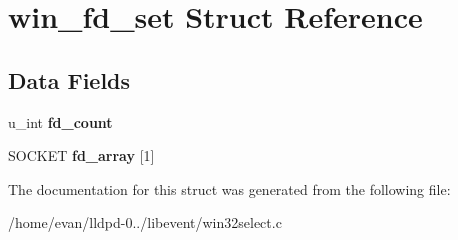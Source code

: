 \section{win\-\_\-fd\-\_\-set \-Struct \-Reference}
\label{structwin__fd__set}
\subsection*{\-Data \-Fields}
\begin{DoxyCompactItemize}
\item 
u\-\_\-int {\bfseries fd\-\_\-count}\label{structwin__fd__set_a36b1f79c9d19bb3e33cd13fb121f0fcc}

\item 
\-S\-O\-C\-K\-E\-T {\bfseries fd\-\_\-array} [1]\label{structwin__fd__set_a8cb46733e22f8d01384016b59cf5305c}

\end{DoxyCompactItemize}


\-The documentation for this struct was generated from the following file\-:\begin{DoxyCompactItemize}
\item 
/home/evan/lldpd-\/0../libevent/win32select.\-c\end{DoxyCompactItemize}
